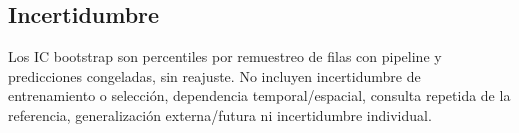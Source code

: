 \subsection{Incertidumbre}
Los IC bootstrap son percentiles por remuestreo de filas con pipeline y predicciones congeladas, sin reajuste. No incluyen incertidumbre de entrenamiento o selección, dependencia temporal/espacial, consulta repetida de la referencia, generalización externa/futura ni incertidumbre individual.
